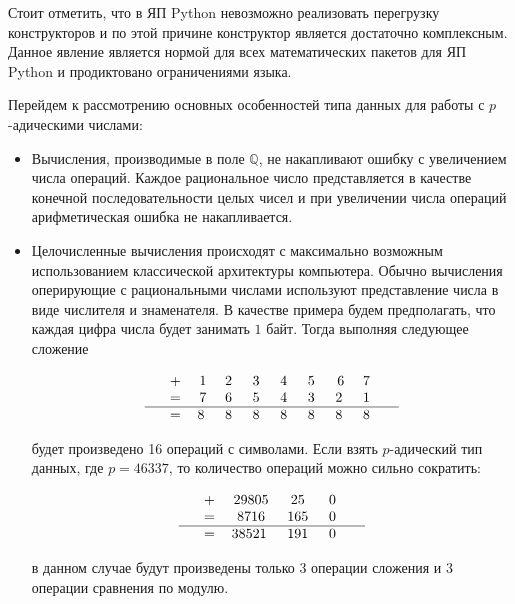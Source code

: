 \documentclass[master, och, diploma, times]{sty/SCWorks}
\theoremstyle{plain}
\theoremstyle{definition}
\numberwithin{equation}{section}
\begin{document}
Стоит отметить, что в ЯП Python невозможно реализовать перегрузку конструкторов и по этой причине конструктор является достаточно комплексным. Данное явление является нормой для всех математических пакетов для ЯП Python и продиктовано ограничениями языка.  


Перейдем к рассмотрению основных особенностей типа данных для работы с $p$-адическими числами:

\begin{itemize}

\item Вычисления, производимые в поле $\mathbb{Q}$, не накапливают ошибку с увеличением числа операций. Каждое рациональное число представляется в качестве конечной последовательности целых чисел и при увеличении числа операций арифметическая ошибка не накапливается.

\item Целочисленные вычисления происходят с максимально возможным использованием классической архитектуры компьютера. Обычно вычисления оперирующие с рациональными числами используют представление числа в виде числителя и знаменателя. В качестве примера будем предполагать, что каждая цифра числа будет занимать $1$ байт. Тогда выполняя следующее сложение

$$
\begin{tabular}{ccccccccccc}
& + & 1 & 2\; & 3\; & 4\; & 5\; & 6 & 7\; &  \\
& = & 7 & 6\; & 5\; & 4\; & 3\; & 2\; & 1\; &  \\
\hline
& = & 8\; & 8\; & 8\; & 8\; & 8\; & 8\; & 8\; &
\end{tabular}
$$

будет произведено 16 операций с символами. Если взять $p$-адический тип данных, где $p=46337$, то количество операций можно сильно сократить:

$$
\begin{tabular}{ccccccccccc}
& + & 29805 & 25\; & 0\; &  \\
& = & 8716 & 165\; & 0\; & \\
\hline
& = & 38521\; & 191\; & 0\; &
\end{tabular}
$$

в данном случае будут произведены только $3$ операции сложения и $3$ операции сравнения по модулю.


\end{itemize}
\end{document}
